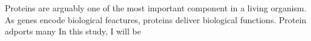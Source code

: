 Proteins are arguably one of the most important component in a living organism. As genes encode biological feactures, proteins deliver biological functions. Protein adports many  In this study, I will be 